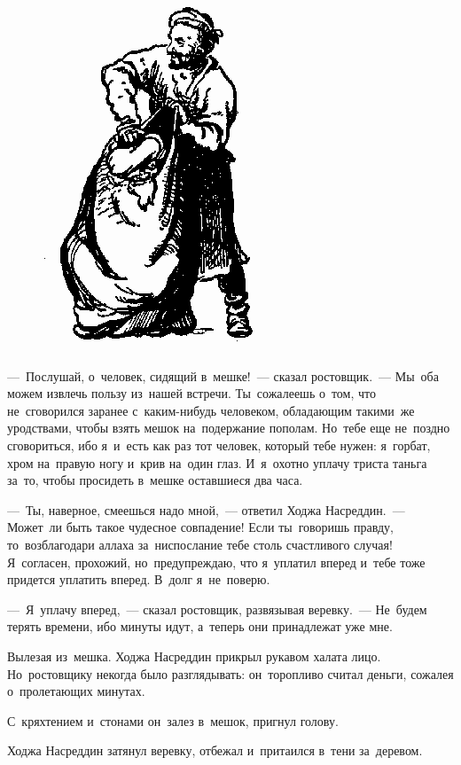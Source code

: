 \documentclass[12pt,a4paper]{book}
\begin{document}
\begin{figure}[t]
\centering
\includegraphics[scale=0.75]{20.png}
\end{figure}

—~Послушай, о~человек, сидящий в~мешке!~— сказал ростовщик.~— Мы~оба можем извлечь пользу из~нашей встречи. Ты~сожалеешь о~том, что не~сговорился заранее с~каким-нибудь человеком, обладающим такими~же уродствами, чтобы взять мешок на~подержание пополам. Но~тебе еще не~поздно сговориться, ибо я~и~есть как раз тот человек, который тебе нужен: я~горбат, хром на~правую ногу и~крив на~один глаз. И~я~охотно уплачу триста таньга за~то, чтобы просидеть в~мешке оставшиеся два часа.

—~Ты, наверное, смеешься надо мной,~— ответил Ходжа Насреддин.~— Может~ли быть такое чудесное совпадение! Если ты~говоришь правду, то~возблагодари аллаха за~ниспослание тебе столь счастливого случая! Я~согласен, прохожий, но~предупреждаю, что я~уплатил вперед и~тебе тоже придется уплатить вперед. В~долг я~не~поверю.

—~Я~уплачу вперед,~— сказал ростовщик, развязывая веревку.~— Не~будем терять времени, ибо минуты идут, а~теперь они принадлежат уже мне.

Вылезая из~мешка. Ходжа Насреддин прикрыл рукавом халата лицо. Но~ростовщику некогда было разглядывать: он~торопливо считал деньги, сожалея о~пролетающих минутах.

С~кряхтением и~стонами он~залез в~мешок, пригнул голову.

Ходжа Насреддин затянул веревку, отбежал и~притаился в~тени за~деревом.
\end{document}
